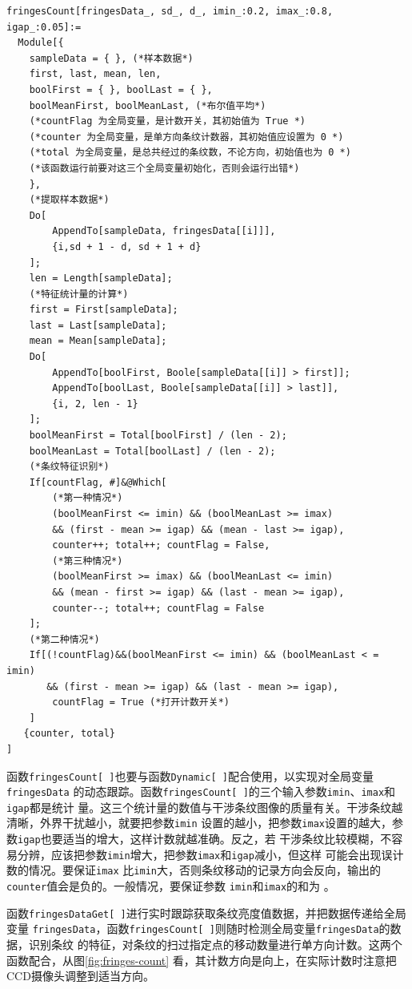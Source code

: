 \documentclass[UTF8,a4paper,12pt]{article}
\begin{document}
\begin{verbatim}
fringesCount[fringesData_, sd_, d_, imin_:0.2, imax_:0.8, igap_:0.05]:=
  Module[{
    sampleData = { }, (*样本数据*)
    first, last, mean, len,
    boolFirst = { }, boolLast = { },
    boolMeanFirst, boolMeanLast, (*布尔值平均*)
    (*countFlag 为全局变量，是计数开关，其初始值为 True *)
    (*counter 为全局变量，是单方向条纹计数器，其初始值应设置为 0 *)
    (*total 为全局变量，是总共经过的条纹数，不论方向，初始值也为 0 *)
    (*该函数运行前要对这三个全局变量初始化，否则会运行出错*)
    },
    (*提取样本数据*)
    Do[
        AppendTo[sampleData, fringesData[[i]]], 
        {i,sd + 1 - d, sd + 1 + d}
    ];
    len = Length[sampleData];
    (*特征统计量的计算*)
    first = First[sampleData];
    last = Last[sampleData]; 
    mean = Mean[sampleData];
    Do[
        AppendTo[boolFirst, Boole[sampleData[[i]] > first]];
        AppendTo[boolLast, Boole[sampleData[[i]] > last]],
        {i, 2, len - 1}
    ];
    boolMeanFirst = Total[boolFirst] / (len - 2);
    boolMeanLast = Total[boolLast] / (len - 2);
    (*条纹特征识别*)
    If[countFlag, #]&@Which[
        (*第一种情况*)
        (boolMeanFirst <= imin) && (boolMeanLast >= imax)
        && (first - mean >= igap) && (mean - last >= igap), 
        counter++; total++; countFlag = False,
        (*第三种情况*)
        (boolMeanFirst >= imax) && (boolMeanLast <= imin)
        && (mean - first >= igap) && (last - mean >= igap),
        counter--; total++; countFlag = False
    ];
    (*第二种情况*)
    If[(!countFlag)&&(boolMeanFirst <= imin) && (boolMeanLast < = imin)
       && (first - mean >= igap) && (last - mean >= igap),
        countFlag = True (*打开计数开关*)
    ]
   {counter, total}
]
\end{verbatim}

函数\verb|fringesCount[ ]|也要与函数\verb|Dynamic[ ]|配合使用，以实现对全局变量\\
\verb|fringesData|
的动态跟踪。函数\verb|fringesCount[ ]|的三个输入参数\verb|imin|、\verb|imax|和\verb|igap|都是统计
量。这三个统计量的数值与干涉条纹图像的质量有关。干涉条纹越清晰，外界干扰越小，就要把参数\verb|imin|
设置的越小，把参数\verb|imax|设置的越大，参数\verb|igap|也要适当的增大，这样计数就越准确。反之，若
干涉条纹比较模糊，不容易分辨，应该把参数\verb|imin|增大，把参数\verb|imax|和\verb|igap|减小，但这样
可能会出现误计数的情况。要保证\verb|imax|
比\verb|imin|大，否则条纹移动的记录方向会反向，输出的\verb|counter|值会是负的。一般情况，要保证参数
\verb|imin|和\verb|imax|的和为 。

函数\verb|fringesDataGet[ ]|进行实时跟踪获取条纹亮度值数据，并把数据传递给全局变量
\verb|fringesData|，函数\verb|fringesCount[ ]|则随时检测全局变量\verb|fringesData|的数据，识别条纹
的特征，对条纹的扫过指定点的移动数量进行单方向计数。这两个函数配合，从图\;\ref{fig:fringes-count} 
看，其计数方向是向上，在实际计数时注意把CCD摄像头调整到适当方向。
\end{document}
